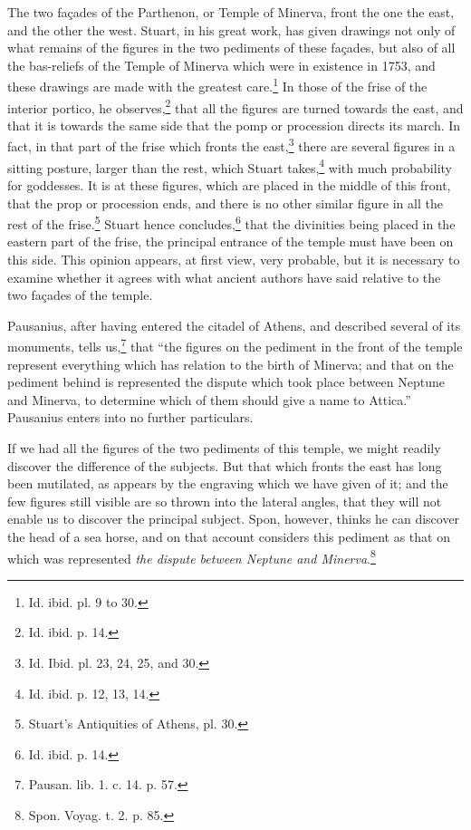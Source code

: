 \documentclass[a4paper, 11pt, oneside, polutonikogreek, english]{article}
\begin{document}
The two façades of the Parthenon, or Temple of Minerva, front the one the east, and the other the west. Stuart, in his great work, has given drawings not only of what remains of the figures in the two pediments of these façades, but also of all the bas-reliefs of the Temple of Minerva which were in existence in 1753, and these drawings are made with the greatest care.\footnote{Id. ibid. pl. 9 to 30.} In those of the frise of the interior portico, he observes,\footnote{Id. ibid. p. 14.} that all the figures are turned towards the east, and that it is towards the same side that the pomp or procession directs its march. In fact, in that part of the frise which fronts the east,\footnote{Id. Ibid. pl. 23, 24, 25, and 30.} there are several figures in a sitting posture, larger than the rest, which Stuart takes,\footnote{Id. ibid. p. 12, 13, 14.} with much probability for goddesses. It is at these figures, which are placed in the middle of this front, that the prop or procession ends, and there is no other similar figure in all the rest of the frise.\footnote{Stuart's Antiquities of Athens, pl. 30.} Stuart hence concludes,\footnote{Id. ibid. p. 14.} that the divinities being placed in the eastern part of the frise, the principal entrance of the temple must have been on this side. This opinion appears, at first view, very probable, but it is necessary to examine whether it agrees with what ancient authors have said relative to the two façades of the temple.

Pausanius, after having entered the citadel of Athens, and described several of its monuments, tells us,\footnote{Pausan. lib. 1. c. 14. p. 57.} that ``the figures on the pediment in the front of the temple represent everything which has relation to the birth of Minerva; and that on the pediment behind is represented the dispute which took place between Neptune and Minerva, to determine which of them should give a name to Attica.'' Pausanius enters into no further particulars.

If we had all the figures of the two pediments of this temple, we might readily discover the difference of the subjects. But that which fronts the east has long been mutilated, as appears by the engraving which we have given of it; and the few figures still visible are so thrown into the lateral angles, that they will not enable us to discover the principal subject. Spon, however, thinks he can discover the head of a sea horse, and on that account considers this pediment as that on which was represented \emph{the dispute between Neptune and Minerva}.\footnote{Spon. Voyag. t. 2. p. 85.}
\end{document}
